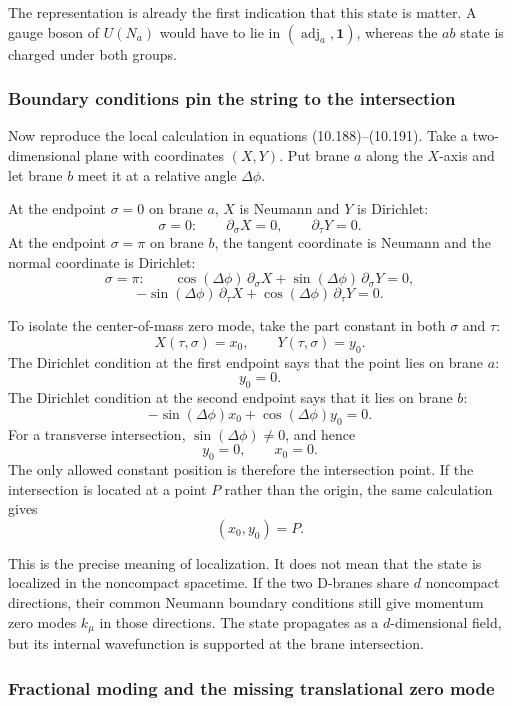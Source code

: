 \documentclass[
  10pt,
  a4paper,
  openany]{book}
\begin{document}
The representation is already the first indication that this state is
matter. A gauge boson of \(U(N_a)\) would have to lie in
\((\operatorname{adj}_{a},\mathbf1)\), whereas the \(ab\) state is
charged under both groups.

\subsubsection{Boundary conditions pin the string to the
intersection}\label{boundary-conditions-pin-the-string-to-the-intersection}

Now reproduce the local calculation in equations (10.188)--(10.191).
Take a two-dimensional plane with coordinates \((X,Y)\). Put brane \(a\)
along the \(X\)-axis and let brane \(b\) meet it at a relative angle
\(\Delta\phi\).

At the endpoint \(\sigma=0\) on brane \(a\), \(X\) is Neumann and \(Y\)
is Dirichlet: \[
\sigma=0:
\qquad
\partial_\sigma X=0,
\qquad
\partial_\tau Y=0.
\] At the endpoint \(\sigma=\pi\) on brane \(b\), the tangent coordinate
is Neumann and the normal coordinate is Dirichlet: \[
\sigma=\pi:
\qquad
\cos(\Delta\phi)\,\partial_\sigma X
+\sin(\Delta\phi)\,\partial_\sigma Y=0,
\] \[
-\sin(\Delta\phi)\,\partial_\tau X
+\cos(\Delta\phi)\,\partial_\tau Y=0.
\]

To isolate the center-of-mass zero mode, take the part constant in both
\(\sigma\) and \(\tau\): \[
X(\tau,\sigma)=x_0,
\qquad
Y(\tau,\sigma)=y_0.
\] The Dirichlet condition at the first endpoint says that the point
lies on brane \(a\): \[
y_0=0.
\] The Dirichlet condition at the second endpoint says that it lies on
brane \(b\): \[
-\sin(\Delta\phi)x_0
+\cos(\Delta\phi)y_0=0.
\] For a transverse intersection, \(\sin(\Delta\phi)\neq0\), and hence
\[
y_0=0,
\qquad
x_0=0.
\] The only allowed constant position is therefore the intersection
point. If the intersection is located at a point \(P\) rather than the
origin, the same calculation gives \[
(x_0,y_0)=P.
\]

This is the precise meaning of localization. It does not mean that the
state is localized in the noncompact spacetime. If the two D-branes
share \(d\) noncompact directions, their common Neumann boundary
conditions still give momentum zero modes \(k_\mu\) in those directions.
The state propagates as a \(d\)-dimensional field, but its internal
wavefunction is supported at the brane intersection.

\subsubsection{Fractional moding and the missing translational zero
mode}\label{fractional-moding-and-the-missing-translational-zero-mode}
\end{document}
